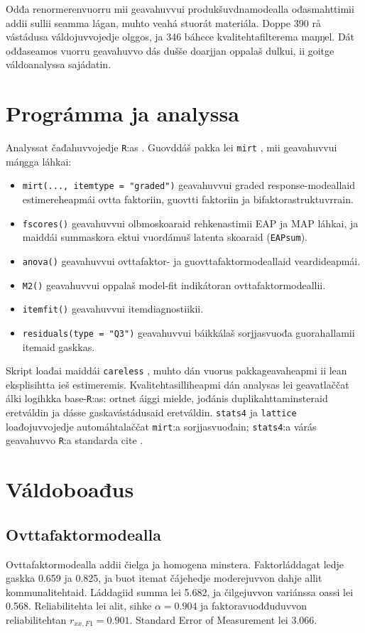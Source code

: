 \documentclass[11pt,a4paper]{article}
\begin{document}
Odđa renormerenvuorru mii geavahuvvui produkšuvdnamodealla ođasmahttimii addii sullii seamma lágan, muhto veahá stuorát materiála. Doppe 390 rå vástádusa váldojuvvojedje olggos, ja 346 báhcce kvalitehtafilterema maŋŋel. Dát ođđaseamos vuorru geavahuvvo dás dušše doarjjan oppalaš dulkui, ii goitge váldoanalyssa sajádatin.

\section{Prográmma ja analyssa}
Analyssat čađahuvvojedje \texttt{R}:as \parencite{RCore2026}. Guovddáš pakka lei \texttt{mirt} \parencite{Chalmers2012mirt}, mii geavahuvvui máŋgga láhkai:

\begin{itemize}
\item \texttt{mirt(..., itemtype = "graded")} geavahuvvui graded response-modeallaid estimereheapmái ovtta faktoriin, guovtti faktoriin ja bifaktorastruktuvrrain.
\item \texttt{fscores()} geavahuvvui olbmoskoaraid rehkenastimii EAP ja MAP láhkai, ja maiddái summaskora ektui vuordámuš latenta skoaraid (\texttt{EAPsum}).
\item \texttt{anova()} geavahuvvui ovttafaktor- ja guovttafaktormodeallaid veardideapmái.
\item \texttt{M2()} geavahuvvui oppalaš model-fit indikátoran ovttafaktormodeallii.
\item \texttt{itemfit()} geavahuvvui itemdiagnostiikii.
\item \texttt{residuals(type = "Q3")} geavahuvvui báikkálaš sorjjasvuođa guorahallamii itemaid gaskkas.
\end{itemize}

Skript loađai maiddái \texttt{careless} \parencite{YentesWilhelm2023careless}, muhto dán vuorus pakkageavaheapmi ii lean eksplisihtta ieš estimeremis. Kvalitehtasilliheapmi dán analysas lei geavatlaččat álki logihkka base-\texttt{R}:as: ortnet áiggi mielde, jođánis duplikahttaminsteraid eretváldin ja dásse gaskavástádusaid eretváldin. \texttt{stats4} ja \texttt{lattice} \parencite{Sarkar2008lattice} loađojuvvojedje automáhtalaččat \texttt{mirt}:a sorjjasvuođain; \texttt{stats4}:a várás geavahuvvo \texttt{R}:a standarda cite \parencite{RCore2026}.

\section{Váldoboađus}
\subsection{Ovttafaktormodealla}
Ovttafaktormodealla addii čielga ja homogena minstera. Faktorláddagat ledje gaskka 0.659 ja 0.825, ja buot itemat čájehedje moderejuvvon dahje allit kommunalitehtaid. Láddagiid summa lei 5.682, ja čilgejuvvon variánssa oassi lei 0.568. Reliabilitehta lei alit, sihke $\alpha = 0.904$ ja faktoravuođđuduvvon reliabilitehtan $r_{xx,F1} = 0.901$. Standard Error of Measurement lei 3.066.
\end{document}
